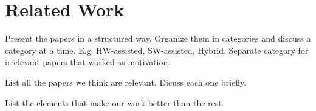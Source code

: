 \section{Related Work}
\label{sec:Related}

Present the papers in a structured way. Organize them in categories and discuss a category at a time. E.g. HW-assisted, SW-assisted, Hybrid. Separate category for irrelevant papers that worked as motivation.

List all the papers we think are relevant. Dicuss each one briefly.

List the elements that make our work better than the rest.
